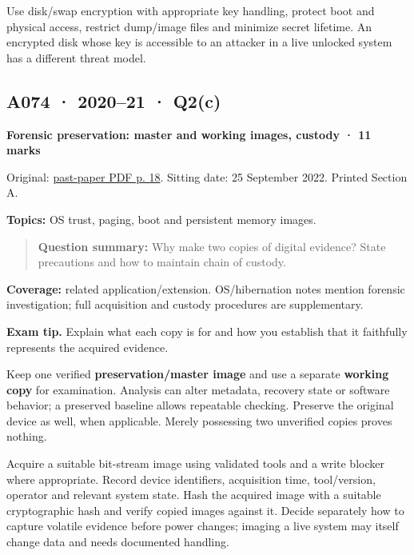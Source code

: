 \documentclass[11pt,a4paper]{article}
\begin{document}
Use disk/\allowbreak{}swap encryption with appropriate key handling,\allowbreak{} protect boot and physical access,\allowbreak{} restrict dump/\allowbreak{}image files and minimize secret lifetime. An encrypted disk whose key is accessible to an attacker in a live unlocked system has a different threat model.




\clearpage
\subsection{A074 · 2020–21 · Q2(c)}\label{a074}

\textbf{Forensic preservation: master and working images,\allowbreak{} custody · 11 marks}


Original: \href{../../CSE405-Security_Merged.pdf\#page=18}{past-paper PDF p. 18}. Sitting date: 25 September 2022. Printed Section A.


\textbf{Topics:} OS trust,\allowbreak{} paging,\allowbreak{} boot and persistent memory images.



\begin{quote}\small

\textbf{Question summary:} Why make two copies of digital evidence? State precautions and how to maintain chain of custody.



\end{quote}

\textbf{Coverage:} related application/\allowbreak{}extension. OS/\allowbreak{}hibernation notes mention forensic investigation; full acquisition and custody procedures are supplementary.



{\color{ForestGreen}\textbf{Exam tip.} Explain what each copy is for and how you establish that it faithfully represents the acquired evidence.}


Keep one verified \textbf{preservation/\allowbreak{}master image} and use a separate \textbf{working copy} for examination. Analysis can alter metadata,\allowbreak{} recovery state or software behavior; a preserved baseline allows repeatable checking. Preserve the original device as well,\allowbreak{} when applicable. Merely possessing two unverified copies proves nothing.


Acquire a suitable bit-stream image using validated tools and a write blocker where appropriate. Record device identifiers,\allowbreak{} acquisition time,\allowbreak{} tool/\allowbreak{}version,\allowbreak{} operator and relevant system state. Hash the acquired image with a suitable cryptographic hash and verify copied images against it. Decide separately how to capture volatile evidence before power changes; imaging a live system may itself change data and needs documented handling.
\end{document}
